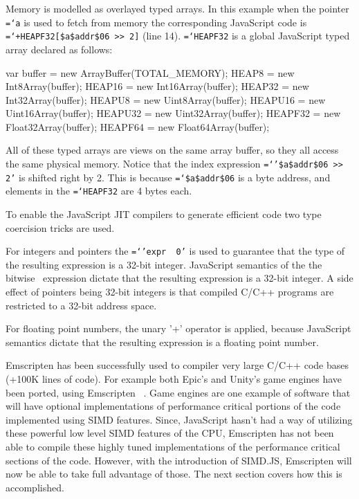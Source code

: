 \documentclass[preprint]{sigplanconf}
\newcommand{\ttt}[1]{{\texttt{\hyphenchar\font=`\-\relax #1}}}%
\begin{document}
Memory is modelled as overlayed typed arrays.
In this example when the pointer \ttt{*a} is used to fetch from memory the corresponding
JavaScript code is \ttt{+HEAPF32[\$a\$addr\$06 >> 2]} (line 14).
\ttt{HEAPF32} is a global JavaScript typed array declared as follows:

\smallskip
\begin{program}[style=tt]
var buffer = new ArrayBuffer(TOTAL\_MEMORY);\newline
HEAP8 = new Int8Array(buffer);\newline
HEAP16 = new Int16Array(buffer);\newline
HEAP32 = new Int32Array(buffer);\newline
HEAPU8 = new Uint8Array(buffer);\newline
HEAPU16 = new Uint16Array(buffer);\newline
HEAPU32 = new Uint32Array(buffer);\newline
HEAPF32 = new Float32Array(buffer);\newline
HEAPF64 = new Float64Array(buffer);\newline
\end{program}
\smallskip

All of these typed arrays are views on the same array buffer, so they all
access the same physical memory.  Notice that the index expression
\ttt{'\$a\$addr\$06 >> 2'} is shifted right by 2.
This is because \ttt{\$a\$addr\$06} is a byte address, and elements in the
\ttt{HEAPF32} are 4 bytes each.

To enable the JavaScript JIT compilers to generate efficient code two
type coercision tricks are used.

For integers and pointers the \ttt{'expr \textbar\ 0'} is used to guarantee
that the type of the resulting expression is a 32-bit integer.  JavaScript
semantics of the the bitwise \textbar\ expression dictate that the resulting
expression is a 32-bit integer.  A side effect of pointers being 32-bit integers
is that compiled C/C++ programs are restricted to a 32-bit address space.

For floating point numbers, the unary '+' operator is applied, because JavaScript
semantics dictate that the resulting expression is a floating point number.

Emscripten has been successfully used to compiler very large C/C++ code
bases (+100K lines of code).  For example both Epic's and Unity's game engines
have been ported, using Emscripten ~\cite{unreal-emscripten}.  Game engines are one example of
software that will have optional implementations of performance critical
portions of the code implemented using SIMD features.  Since, JavaScript
hasn't had a way of utilizing these powerful low level SIMD features of the
CPU, Emscripten has not been able to compile these highly tuned implementations
of the performance critical sections of the code. However, with the introduction
of SIMD.JS, Emscripten will now be able to take full advantage of those.  The next
section covers how this is accomplished.
\end{document}
